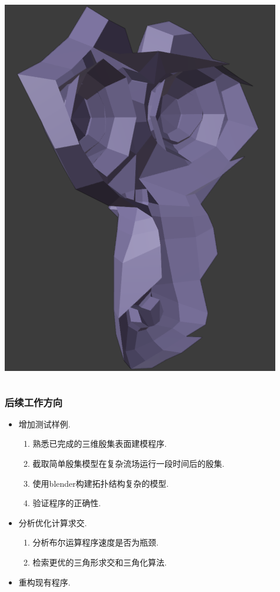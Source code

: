 \documentclass[UTF8]{ctexbeamer}	%
\theoremstyle{plain}
\theoremstyle{definition}
\theoremstyle{remark}
\numberwithin{equation}{section}
\begin{document}
\begin{frame}
\begin{columns}
        \includegraphics[width = \textwidth]{fig/wrong7.png}
        
    \end{columns}

\end{frame}

\begin{frame}
    \frametitle{后续工作方向}
    \begin{itemize}
        \item 增加测试样例.
        \begin{enumerate}
        \item 熟悉已完成的三维殷集表面建模程序.
        \item 截取简单殷集模型在复杂流场运行一段时间后的殷集.
        \item 使用blender构建拓扑结构复杂的模型.
        \item 验证程序的正确性.
    \end{enumerate}
    
    \item 分析优化计算求交.
    \begin{enumerate}
        \item 分析布尔运算程序速度是否为瓶颈.
        \item 检索更优的三角形求交和三角化算法.
    \end{enumerate}

    \item 重构现有程序.
    \end{itemize}
\end{frame}
\end{document}
